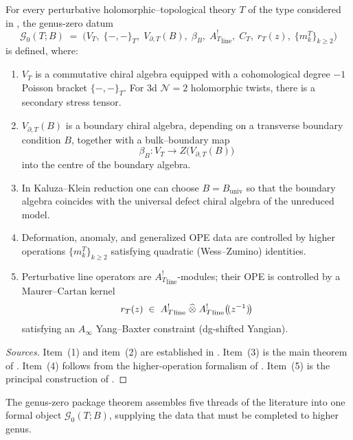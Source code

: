 \begin{theorem}
\label{thm:genus-zero-holographic-package}
For every perturbative holomorphic--topological theory $T$ of the type considered in
\cite{CDG20, Zeng23, GKW24, KZ25, DNP25}, the genus-zero datum
\[
\mathcal G_0(T;B)
\;=\;
\bigl(V_T,\;\{-,-\}_T,\;V_{\partial,T}(B),\;\beta_B,\;{A_T^!}_{\mathrm{line}},\;C_T,\;r_T(z),\;\{m_k^T\}_{k\ge 2}\bigr)
\]
is defined, where:
\begin{enumerate}[label=\textup{(\arabic*)}]
\item $V_T$ is a commutative chiral algebra equipped with a cohomological degree $-1$ Poisson
bracket $\{-,-\}_T$. For $3$d $\mathcal N=2$ holomorphic twists, there is a secondary stress
tensor.

\item $V_{\partial,T}(B)$ is a boundary chiral algebra, depending on a transverse boundary
condition $B$, together with a bulk--boundary map
\[
\beta_B:V_T\longrightarrow Z\bigl(V_{\partial,T}(B)\bigr)
\]
into the centre of the boundary algebra.

\item In Kaluza--Klein reduction one can choose $B=B_{\mathrm{univ}}$ so that the boundary algebra
coincides with the universal defect chiral algebra of the unreduced model.

\item Deformation, anomaly, and generalized OPE data are controlled by higher operations
$\{m_k^T\}_{k\ge 2}$ satisfying quadratic (Wess--Zumino) identities.

\item Perturbative line operators are ${A_T^!}_{\mathrm{line}}$-modules; their OPE is controlled by a
Maurer--Cartan kernel
\[
r_T(z)\;\in\;{A_T^!}_{\mathrm{line}}\;\widehat\otimes\;{A_T^!}_{\mathrm{line}}\bigl(\!(z^{-1})\!\bigr)
\]
satisfying an $A_\infty$ Yang--Baxter constraint (dg-shifted Yangian).
\end{enumerate}
\end{theorem}

\begin{proof}[Sources]
Item~\textup{(1)} and item~\textup{(2)} are established in
\cite{CDG20}. Item~\textup{(3)} is the main theorem of \cite{Zeng23}. Item~\textup{(4)}
follows from the higher-operation formalism of \cite{GKW24}. Item~\textup{(5)} is the
principal construction of \cite{DNP25}.
\end{proof}

\begin{remark}
\label{rem:genus-zero-package-modular-context}
The genus-zero package theorem assembles five threads of the
literature into one formal object $\mathcal G_0(T;B)$, supplying the
data that must be completed to higher genus.
\end{remark}

